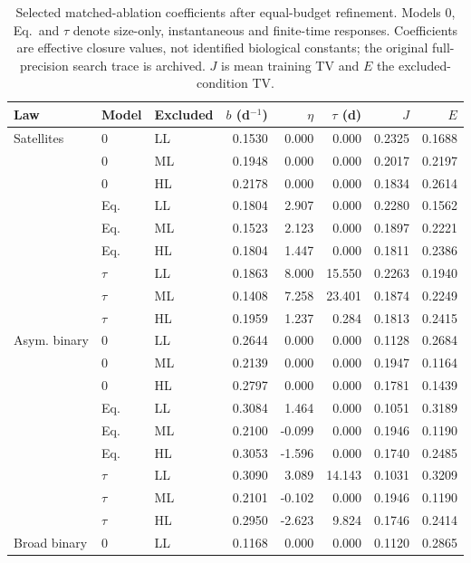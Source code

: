 \begin{table}[H]
\centering\footnotesize
\setlength{\tabcolsep}{3pt}
\caption{Selected matched-ablation coefficients after equal-budget refinement. Models 0, Eq.\ and $\tau$ denote size-only, instantaneous and finite-time responses. Coefficients are effective closure values, not identified biological constants; the original full-precision search trace is archived. $J$ is mean training TV and $E$ the excluded-condition TV.}
\label{tab:matched-parameters}
\begin{tabular}{lllrrrrr}
\toprule
Law & Model & Excluded & $b$ (d$^{-1}$) & $\eta$ & $\tau$ (d) & $J$ & $E$ \\
\midrule
Satellites & 0 & LL & 0.1530 & 0.000 & 0.000 & 0.2325 & 0.1688 \\
 & 0 & ML & 0.1948 & 0.000 & 0.000 & 0.2017 & 0.2197 \\
 & 0 & HL & 0.2178 & 0.000 & 0.000 & 0.1834 & 0.2614 \\
 & Eq. & LL & 0.1804 & 2.907 & 0.000 & 0.2280 & 0.1562 \\
 & Eq. & ML & 0.1523 & 2.123 & 0.000 & 0.1897 & 0.2221 \\
 & Eq. & HL & 0.1804 & 1.447 & 0.000 & 0.1811 & 0.2386 \\
 & $\tau$ & LL & 0.1863 & 8.000 & 15.550 & 0.2263 & 0.1940 \\
 & $\tau$ & ML & 0.1408 & 7.258 & 23.401 & 0.1874 & 0.2249 \\
 & $\tau$ & HL & 0.1959 & 1.237 & 0.284 & 0.1813 & 0.2415 \\
\midrule
Asym. binary & 0 & LL & 0.2644 & 0.000 & 0.000 & 0.1128 & 0.2684 \\
 & 0 & ML & 0.2139 & 0.000 & 0.000 & 0.1947 & 0.1164 \\
 & 0 & HL & 0.2797 & 0.000 & 0.000 & 0.1781 & 0.1439 \\
 & Eq. & LL & 0.3084 & 1.464 & 0.000 & 0.1051 & 0.3189 \\
 & Eq. & ML & 0.2100 & -0.099 & 0.000 & 0.1946 & 0.1190 \\
 & Eq. & HL & 0.3053 & -1.596 & 0.000 & 0.1740 & 0.2485 \\
 & $\tau$ & LL & 0.3090 & 3.089 & 14.143 & 0.1031 & 0.3209 \\
 & $\tau$ & ML & 0.2101 & -0.102 & 0.000 & 0.1946 & 0.1190 \\
 & $\tau$ & HL & 0.2950 & -2.623 & 9.824 & 0.1746 & 0.2414 \\
\midrule
Broad binary & 0 & LL & 0.1168 & 0.000 & 0.000 & 0.1120 & 0.2865 \\

\end{tabular}
\end{table}
